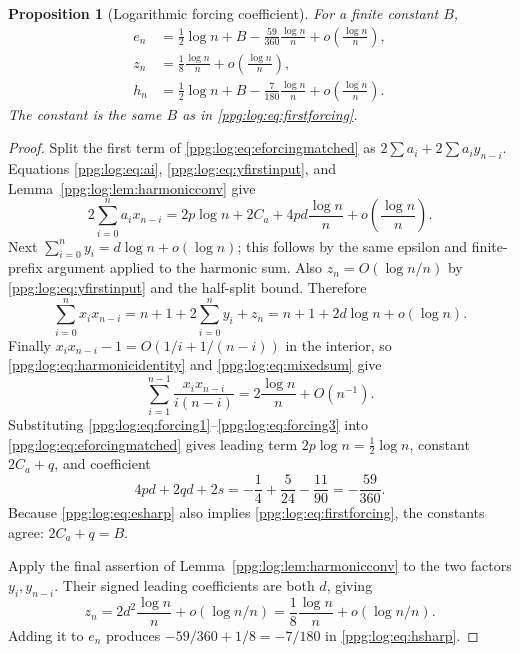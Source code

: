 \documentclass[11pt,letterpaper]{article}
\newtheorem{proposition}[theorem]{Proposition}
\theoremstyle{remark}\newtheorem{remark}[theorem]{Remark}
\numberwithin{equation}{section}
\begin{document}
\begin{proposition}[Logarithmic forcing coefficient]\label{ppg:log:prop:forcing}
For a finite constant $B$,
\begin{align}
 e_n&=\tfrac12\log n+B-\frac{59}{360}\frac{\log n}{n}
                  +o\!\left(\frac{\log n}{n}\right),\label{ppg:log:eq:esharp}\\
 z_n&=\frac18\frac{\log n}{n}
                  +o\!\left(\frac{\log n}{n}\right),\label{ppg:log:eq:zsharp}\\
 h_n&=\tfrac12\log n+B-\frac7{180}\frac{\log n}{n}
                  +o\!\left(\frac{\log n}{n}\right).\label{ppg:log:eq:hsharp}
\end{align}
The constant is the same $B$ as in \eqref{ppg:log:eq:firstforcing}.
\end{proposition}
\begin{proof}
Split the first term of \eqref{ppg:log:eq:eforcingmatched} as $2\sum a_i+2\sum a_iy_{n-i}$. Equations \eqref{ppg:log:eq:ai}, \eqref{ppg:log:eq:yfirstinput}, and Lemma~\ref{ppg:log:lem:harmonicconv} give
\begin{equation}\label{ppg:log:eq:forcing1}
 2\sum_{i=0}^na_ix_{n-i}
 =2p\log n+2C_a+4pd\frac{\log n}{n}
                         +o\!\left(\frac{\log n}{n}\right).
\end{equation}
Next $\sum_{i=0}^ny_i=d\log n+o(\log n)$; this follows by the same epsilon and finite-prefix argument applied to the harmonic sum. Also $z_n=O(\log n/n)$ by \eqref{ppg:log:eq:yfirstinput} and the half-split bound. Therefore
\begin{equation}\label{ppg:log:eq:forcing2}
 \sum_{i=0}^nx_ix_{n-i}=n+1+2\sum_{i=0}^ny_i+z_n
      =n+1+2d\log n+o(\log n).
\end{equation}
Finally $x_ix_{n-i}-1=O(1/i+1/(n-i))$ in the interior, so \eqref{ppg:log:eq:harmonicidentity} and \eqref{ppg:log:eq:mixedsum} give
\begin{equation}\label{ppg:log:eq:forcing3}
 \sum_{i=1}^{n-1}\frac{x_ix_{n-i}}{i(n-i)}
       =2\frac{\log n}{n}+O(n^{-1}).
\end{equation}
Substituting \eqref{ppg:log:eq:forcing1}--\eqref{ppg:log:eq:forcing3} into \eqref{ppg:log:eq:eforcingmatched} gives leading term $2p\log n=\tfrac12\log n$, constant $2C_a+q$, and coefficient
\begin{equation}\label{ppg:log:eq:efactor}
 4pd+2qd+2s=-\frac14+\frac5{24}-\frac{11}{90}
             =-\frac{59}{360}.
\end{equation}
Because \eqref{ppg:log:eq:esharp} also implies \eqref{ppg:log:eq:firstforcing}, the constants agree: $2C_a+q=B$.

Apply the final assertion of Lemma~\ref{ppg:log:lem:harmonicconv} to the two factors $y_i,y_{n-i}$. Their signed leading coefficients are both $d$, giving
\[
 z_n=2d^2\frac{\log n}{n}+o(\log n/n)
     =\frac18\frac{\log n}{n}+o(\log n/n).
\]
Adding it to $e_n$ produces $-59/360+1/8=-7/180$ in \eqref{ppg:log:eq:hsharp}.
\end{proof}
\end{document}
